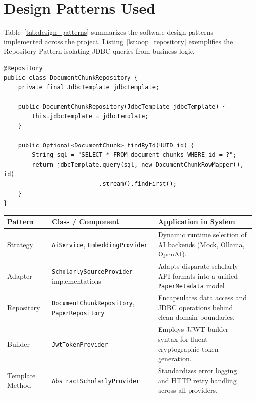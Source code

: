 \documentclass[11pt,a4paper,titlepage]{report}
\begin{document}
\section{Design Patterns Used}
Table~\ref{tab:design_patterns} summarizes the software design patterns implemented across the project. Listing~\ref{lst:oop_repository} exemplifies the Repository Pattern isolating JDBC queries from business logic.

\begin{lstlisting}[caption={Repository Pattern Encapsulating Pure JdbcTemplate Queries}, label={lst:oop_repository}]
@Repository
public class DocumentChunkRepository {
    private final JdbcTemplate jdbcTemplate;

    public DocumentChunkRepository(JdbcTemplate jdbcTemplate) {
        this.jdbcTemplate = jdbcTemplate;
    }

    public Optional<DocumentChunk> findById(UUID id) {
        String sql = "SELECT * FROM document_chunks WHERE id = ?";
        return jdbcTemplate.query(sql, new DocumentChunkRowMapper(), id)
                           .stream().findFirst();
    }
}
\end{lstlisting}

\begin{center}
\label{tab:design_patterns}
\vspace{3pt}
\begin{tabularx}{\textwidth}{llX}
\toprule
\textbf{Pattern} & \textbf{Class / Component} & \textbf{Application in System} \\
\midrule
Strategy & \texttt{AiService}, \texttt{EmbeddingProvider} & Dynamic runtime selection of AI backends (Mock, Ollama, OpenAI). \\
Adapter & \texttt{ScholarlySourceProvider} implementations & Adapts disparate scholarly API formats into a unified \texttt{PaperMetadata} model. \\
Repository & \texttt{DocumentChunkRepository}, \texttt{PaperRepository} & Encapsulates data access and JDBC operations behind clean domain boundaries. \\
Builder & \texttt{JwtTokenProvider} & Employs JJWT builder syntax for fluent cryptographic token generation. \\
Template Method & \texttt{AbstractScholarlyProvider} & Standardizes error logging and HTTP retry handling across all providers. \\
\bottomrule
\end{tabularx}
\end{center}
\end{document}
